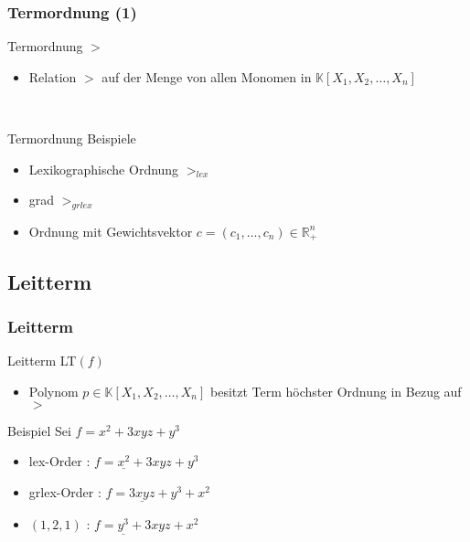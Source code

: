 \documentclass{beamer}
\begin{document}
\begin{frame}[<+->][fragile]
\frametitle{Termordnung (1)}
\begin{block}{Termordnung $>$}
\begin{itemize}
\item Relation $>$ auf der Menge von allen Monomen in $ \mathbb{K} \left[X_{1},X_{2},\dots, X_{n}\right]  $ 
\end{itemize}

\end{block}

~\\

\begin{block}{Termordnung Beispiele }
\begin{itemize}
\item Lexikographische Ordnung $>_{lex}$
\item grad $>_{grlex}$
\item Ordnung mit Gewichtsvektor $c = (c_1, \ldots , c_n ) \in \mathbb{R}^{n}_{+}$
\end{itemize}



\end{block}


\end{frame}
\subsection{Leitterm}


\begin{frame}[fragile]
\frametitle{Leitterm}

\begin{block}{Leitterm \textsc{LT}$(f)$ }
\begin{itemize}
\item Polynom $p \in  \mathbb{K} \left[X_{1},X_{2},\dots, X_{n}\right] $  besitzt Term höchster Ordnung in Bezug auf $>$
\end{itemize}

\end{block}


\begin{block}{Beispiel}
Sei $f = x^{2}+3xyz+y^{3} $
\begin{itemize}

\item lex-Order : $f = \underline{x^{2}} + 3xyz + y^{3}  $
\item grlex-Order :  $f = \underline{3xyz} + y^{3} + x^{2}  $
\item $\left(1,2,1\right)$ :  $f = \underline{y^{3}} + 3xyz + x^{2}  $
\end{itemize}

\end{block}


\end{frame}
\end{document}
